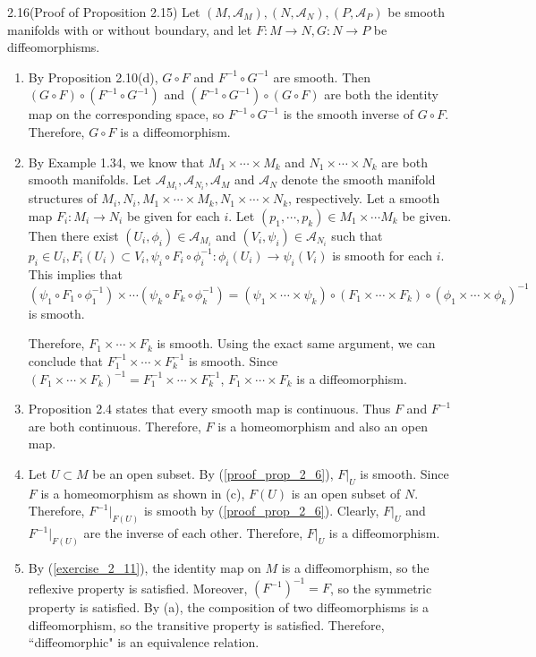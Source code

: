 \begin{customexer}{2.16(Proof of Proposition 2.15)}
  Let $(M, \mathcal{A}_M), (N, \mathcal{A}_N), (P, \mathcal{A}_P)$ be smooth manifolds with or without boundary, and let $F: M \rightarrow N, G: N \rightarrow P$ be diffeomorphisms.
  \begin{enumerate}[label=(\alph*)]
    \item 
      By Proposition 2.10(d), $G \circ F$ and $F^{-1} \circ G^{-1}$ are smooth.
      Then $(G \circ F) \circ (F^{-1} \circ G^{-1})$ and $(F^{-1} \circ G^{-1}) \circ (G \circ F)$ are both the identity map on the corresponding space, so $F^{-1} \circ G^{-1}$ is the smooth inverse of $G \circ F$.
      Therefore, $G \circ F$ is a diffeomorphism.
    \item
      By Example 1.34, we know that $M_1 \times \cdots \times M_k$ and $N_1 \times \cdots \times N_k$ are both smooth manifolds.
      Let $\mathcal{A}_{M_i}, \mathcal{A}_{N_i}, \mathcal{A}_M$ and $\mathcal{A}_N$ denote the smooth manifold structures of $M_i, N_i, M_1 \times \cdots \times M_k, N_1 \times \cdots \times N_k$, respectively.
      Let a smooth map $F_i: M_i \rightarrow N_i$ be given for each $i$.
      Let $(p_1, \cdots, p_k) \in M_1 \times \cdots M_k$ be given.
      Then there exist $(U_i, \phi_i) \in \mathcal{A}_{M_i}$ and $(V_i, \psi_i) \in \mathcal{A}_{N_i}$ such that $p_i \in U_i, F_i(U_i) \subset V_i, \psi_i \circ F_i \circ \phi_i^{-1}: \phi_i(U_i) \rightarrow \psi_i(V_i)$ is smooth for each $i$.
      This implies that $(\psi_1 \circ F_1 \circ \phi_1^{-1}) \times \cdots (\psi_k \circ F_k \circ \phi_k^{-1}) = (\psi_1 \times \cdots \times \psi_k) \circ (F_1 \times \cdots \times F_k) \circ (\phi_1 \times \cdots \times \phi_k)^{-1}$ is smooth.

      Therefore, $F_1 \times \cdots \times F_k$ is smooth.
      Using the exact same argument, we can conclude that $F_1^{-1} \times \cdots \times F_k^{-1}$ is smooth.
      Since $(F_1 \times \cdots \times F_k)^{-1} = F_1^{-1} \times \cdots \times F_k^{-1}$, $F_1 \times \cdots \times F_k$ is a diffeomorphism.
    \item
      Proposition 2.4 states that every smooth map is continuous.
      Thus $F$ and $F^{-1}$ are both continuous.
      Therefore, $F$ is a homeomorphism and also an open map.
    \item
      Let $U \subset M$ be an open subset.
      By (\ref{proof_prop_2_6}), $F\vert_U$ is smooth.
      Since $F$ is a homeomorphism as shown in (c), $F(U)$ is an open subset of $N$.
      Therefore, $F^{-1}\vert_{F(U)}$ is smooth by (\ref{proof_prop_2_6}).
      Clearly, $F\vert_U$ and $F^{-1}\vert_{F(U)}$ are the inverse of each other.
      Therefore, $F\vert_U$ is a diffeomorphism.
    \item
      By (\ref{exercise_2_11}), the identity map on $M$ is a diffeomorphism, so the reflexive property is satisfied.
      Moreover, $(F^{-1})^{-1} = F$, so the symmetric property is satisfied.
      By (a), the composition of two diffeomorphisms is a diffeomorphism, so the transitive property is satisfied.
      Therefore, ``diffeomorphic" is an equivalence relation.
  \end{enumerate}
\end{customexer}

